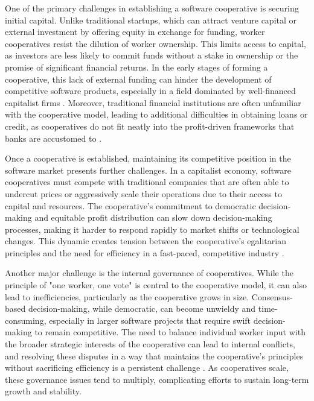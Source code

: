 \begin{refsection}
One of the primary challenges in establishing a software cooperative is securing initial capital. Unlike traditional startups, which can attract venture capital or external investment by offering equity in exchange for funding, worker cooperatives resist the dilution of worker ownership. This limits access to capital, as investors are less likely to commit funds without a stake in ownership or the promise of significant financial returns. In the early stages of forming a cooperative, this lack of external funding can hinder the development of competitive software products, especially in a field dominated by well-financed capitalist firms \cite[pp.~156-158]{birchall1997}. Moreover, traditional financial institutions are often unfamiliar with the cooperative model, leading to additional difficulties in obtaining loans or credit, as cooperatives do not fit neatly into the profit-driven frameworks that banks are accustomed to \cite[pp.~123-125]{restakis2012}.

Once a cooperative is established, maintaining its competitive position in the software market presents further challenges. In a capitalist economy, software cooperatives must compete with traditional companies that are often able to undercut prices or aggressively scale their operations due to their access to capital and resources. The cooperative’s commitment to democratic decision-making and equitable profit distribution can slow down decision-making processes, making it harder to respond rapidly to market shifts or technological changes. This dynamic creates tension between the cooperative’s egalitarian principles and the need for efficiency in a fast-paced, competitive industry \cite[pp.~62-64]{alperovitz2011}.

Another major challenge is the internal governance of cooperatives. While the principle of "one worker, one vote" is central to the cooperative model, it can also lead to inefficiencies, particularly as the cooperative grows in size. Consensus-based decision-making, while democratic, can become unwieldy and time-consuming, especially in larger software projects that require swift decision-making to remain competitive. The need to balance individual worker input with the broader strategic interests of the cooperative can lead to internal conflicts, and resolving these disputes in a way that maintains the cooperative’s principles without sacrificing efficiency is a persistent challenge \cite[pp.~185-187]{rothschild2009}. As cooperatives scale, these governance issues tend to multiply, complicating efforts to sustain long-term growth and stability.


\end{refsection}
